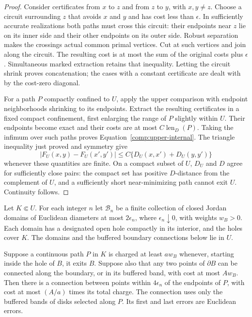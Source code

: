 \begin{proof}
Consider certificates from $x$ to $z$ and from $z$ to $y$, with $x,y\ne z$.
Choose a circuit surrounding $z$ that avoids $x$ and $y$ and has cost less
than $\epsilon$.  In sufficiently accurate realizations both paths must
cross this circuit: their endpoints near $z$ lie on its inner side and
their other endpoints on its outer side.  Robust separation makes the
crossings actual common primal vertices.  Cut at such vertices and join
along the circuit.  The resulting cost is at most the sum of the original
costs plus $\epsilon$.  Simultaneous marked extraction retains that
inequality.  Letting the circuit shrink proves concatenation; the cases
with a constant certificate are dealt with by the cost-zero diagonal.

For a path $P$ compactly confined to $U$, apply the upper comparison with
endpoint neighborhoods shrinking to its endpoints.  Extract the resulting
certificates in a fixed compact confinement, first enlarging the range of
$P$ slightly within $U$.  Their endpoints become exact and their costs are
at most $C\operatorname{len}_D(P)$.  Taking the infimum over such paths
proves Equation~\eqref{comp:upper-internal}.  The triangle inequality just
proved and symmetry give
\[
 |F_U(x,y)-F_U(x',y')|
 \le C\{D_U(x,x')+D_U(y,y')\}
\]
whenever these quantities are finite.  On a compact subset of $U$, $D_U$
and $D$ agree for sufficiently close pairs: the compact set has positive
$D$-distance from the complement of $U$, and a sufficiently short
near-minimizing path cannot exit $U$.  Continuity follows.
\end{proof}

\begin{lemma}\label{comp:circle-chain}
Let $K\Subset U$.  For each integer $n$ let $\mathcal B_n$ be a finite
collection of closed Jordan domains of Euclidean diameters at most
$2\epsilon_n$, where $\epsilon_n\downarrow0$, with weights $w_B>0$.
Each domain has a designated open hole compactly in its interior, and
the holes cover $K$.  The domains and the buffered boundary connections
below lie in $U$.

Suppose a continuous path $P$ in $K$ is charged at least $aw_B$ whenever,
starting inside the hole of $B$, it exits $B$.  Suppose also that any two
points of $\partial B$ can be connected along the boundary, or in its
buffered band, with cost at most $Aw_B$.  Then there is a connection between points within
$4\epsilon_n$ of the endpoints of $P$, with cost at most
$(A/a)$ times its total charge.  The connection uses only the buffered
bands of disks selected along $P$.  Its first and last errors are
Euclidean errors.
\end{lemma}


